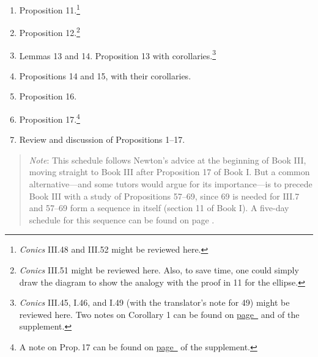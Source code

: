 \documentclass[10pt]{article}
\begin{document}
\begin{enumerate}[resume*] \item Proposition
		11.\footnote{\emph{Conics} III.48 and III.52
			might be reviewed here.} \item
		Proposition 12.\footnote{\emph{Conics}
			III.51 might be reviewed here. Also,
			to save time, one could simply draw
			the diagram to show the analogy with
			the proof in 11 for the ellipse.}
	\item Lemmas 13 and 14. Proposition 13 with
		corollaries.\footnote{\emph{Conics} III.45,
			I.46, and I.49 (with the
			translator's note for 49) might be
			reviewed here. Two notes on Corollary 1 can be
			found on \hyperref[supple.96]{page~\pageref{supple.96}} and \hyperref[supple.98]{\pageref{supple.98}} of the supplement.} \item Propositions
		14 and 15, with their corollaries.  \item
		Proposition 16.  \item Proposition 17.\footnote{A
		note on Prop.\,17 can be found on \hyperref[supple.99]{page~\pageref{supple.99}} of the supplement.}
	\item Review and discussion of Propositions 1--17.
\end{enumerate} 
\begin{quote} \small{\emph{Note}: This
		schedule follows Newton's advice at the
		beginning of Book III, moving straight to
		Book III after Proposition 17 of Book I. But
		a common alternative---and some tutors would
		argue for its importance---is to precede
		Book III with a study of Propositions
		57--69, since 69 is needed for III.7 and
		57--69 form a sequence in itself (section 11
		of Book I). A five-day schedule for this
		sequence can be found on page
		\pageref{Newton}.} \end{quote}
\end{document}
